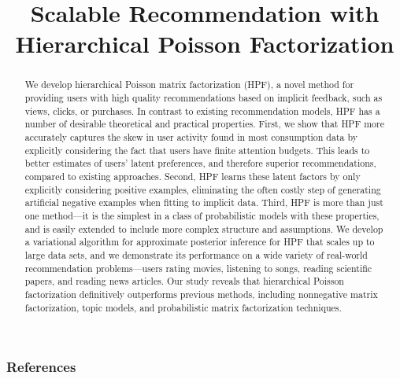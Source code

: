 \documentclass[]{article}
\title{Scalable Recommendation with Hierarchical Poisson Factorization}
\author{} %
\begin{document}
\maketitle

\begin{abstract}
We develop hierarchical Poisson matrix factorization (HPF), a novel
method for providing users with high quality recommendations based on
implicit feedback, such as views, clicks, or purchases.  In contrast
to existing recommendation models, HPF has a number of desirable
theoretical and practical properties.  First, we show that HPF more
accurately captures the skew in user activity found in most
consumption data by explicitly considering the fact that users have
finite attention budgets.  This leads to better estimates of users'
latent preferences, and therefore superior recommendations, compared
to existing approaches.  Second, HPF learns these latent factors by
only explicitly considering positive examples, eliminating the often
costly step of generating artificial negative examples when fitting to
implicit data.  Third, HPF is more than just one method---it is the
simplest in a class of probabilistic models with these properties, and
is easily extended to include more complex structure and assumptions.
We develop a variational algorithm for approximate posterior inference
for HPF that scales up to large data sets, and we demonstrate its
performance on a wide variety of real-world recommendation
problems---users rating movies, listening to songs, reading
scientific papers, and reading news articles.  Our study reveals
that hierarchical Poisson factorization definitively outperforms
previous methods, including nonnegative matrix factorization, topic
models, and probabilistic matrix factorization techniques.
\end{abstract}








\subsubsection*{References}



\end{document}

